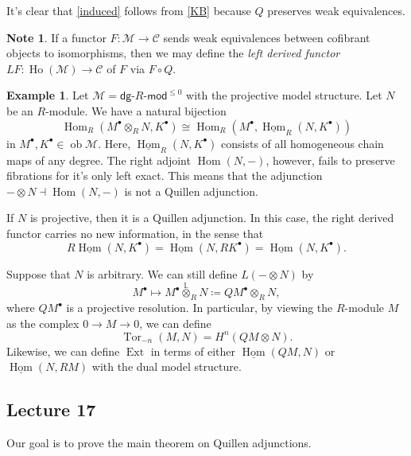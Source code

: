 \documentclass[10pt,letterpaper,cm]{nupset}
\theoremstyle{definition}
\newtheorem{exmp}[defn]{Example}
\newtheorem{note}[defn]{Note}
\theoremstyle{theorem}
\theoremstyle{remark}
\newcommand{\1}{\mathbb{1}}
\renewcommand{\c}{\mathcal{C}}
\newcommand{\m}{\mathcal{M}}
\newcommand{\dg}{\mathsf{dg}}
\newcommand{\0}{\vec 0}
\DeclareMathOperator{\tor}{Tor}
\DeclareMathOperator{\ho}{Ho}
\DeclareMathOperator{\ext}{Ext}
\DeclareMathOperator{\Hom}{Hom}
\DeclareMathOperator{\ob}{ob}
\begin{document}
It's clear that \cref{induced} follows from \cref{KB} because $Q$ preserves weak equivalences. 

\begin{note}
If a functor $F: \m \to \c$ sends weak equivalences between cofibrant objects to isomorphisms, then we may define the \textit{left derived functor} $L{F} : \ho(\m) \to \c$ of $F$ via $F \circ Q$.
\end{note}

\begin{exmp}
Let $\m =  \dg{\text{-}}R{\text{-}}\mathsf{mod}^{\leq 0}$ with the projective model structure. Let $N$ be an $R$-module. We have a natural bijection
\[
\Hom_R(M^{\bullet} \otimes_R N, K^{\bullet}) \cong \Hom_R(M^{\bullet}, \underline{\Hom}_R(N, K^{\bullet}))
\] in $M^{\bullet}, K^{\bullet} \in \ob{\m}$. Here, $\underline{\Hom}_R(N, K^{\bullet})$ consists of all homogeneous  chain maps of any degree.  The right adjoint $\Hom(N, {-})$, however, fails to preserve fibrations for it's only left exact. This means that the adjunction ${-} \otimes N \dashv \Hom(N, {-})$ is not a Quillen adjunction.

\medskip

If $N$ is projective, then it is a Quillen adjunction. In this case, the right derived functor carries no new information, in the sense that
\[
R{\underline{\Hom}(N, K^{\bullet})} = \underline{\Hom}(N, R{K^{\bullet}}) = \underline{\Hom}(N, K^{\bullet}) 
.\]

\medskip

Suppose that $N$ is arbitrary. We can still define $L\left({-} \otimes N\right)$ by
\[
M^{\bullet} \mapsto M^{\bullet} \overset{\mathbb{L}}{\otimes}_R N \coloneqq Q{M^{\bullet}} \otimes_R N,
\] where $Q{M^{\bullet}}$ is a projective resolution.  In particular, by viewing the $R$-module $M$ as the complex $0 \to M \to 0$, we can define
\[
\tor_{-n}(M,N) = H^n(Q{M} \otimes N).
\]
Likewise, we can define $\ext$ in terms of either $\underline{\Hom}(Q{M}, N)$ or $\underline{\Hom}(N, R{M})$ with the dual model structure. 

\end{exmp}

\subsection{Lecture 17}

Our goal is to prove the main theorem on Quillen adjunctions. 
\end{document}
